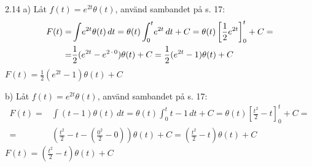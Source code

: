 \begin{task}{2.14 a)}
	Låt $f(t)=e^{2t}\theta(t)$, använd sambandet på s. 17:
	\begin{align*}
	F(t)=
	&\int \! e^{2t}\theta(t) \, dt=
	\theta(t)\int_{0}^{t} \! e^{2t} \, dt+C=
	\theta(t)\left[\frac{1}{2}e^{2t}\right]_{0}^{t}+C= \\ =
	&\frac{1}{2}(e^{2t}-e^{2\operatorname{\cdot}0})\theta(t)+C=
	\frac{1}{2}(e^{2t}-1)\theta(t)+C
	\end{align*}
	\ans $F(t)=\frac{1}{2}(e^{2t}-1)\theta(t)+C$
\end{task}

\begin{task}{b)}
	Låt $f(t)=e^{2t}\theta(t)$, använd sambandet på s. 17:
	\begin{align*}
	F(t)=
	&\int \! (t-1)\theta(t) \, dt=
	\theta(t)\int_{0}^{t} \! t-1 \, dt+C=
	\theta(t)\left[\frac{t^2}{2}-t\right]_{0}^{t}+C= \\ =
	&\left(\frac{t^2}{2}-t-\left(\frac{0^2}{2}-0\right)\right)\theta(t)+C=
	\left(\frac{t^2}{2}-t\right)\theta(t)+C
	\end{align*}
	\ans $F(t)=(\frac{t^2}{2}-t)\theta(t)+C$
\end{task}